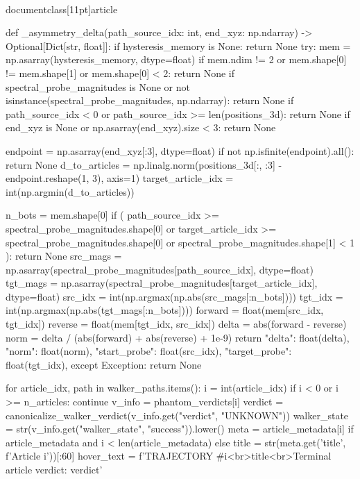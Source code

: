 \\documentclass[11pt]{article}
\begin{document}
\begin{CodeBlock}
{{    def _asymmetry_delta(path_source_idx: int, end_xyz: np.ndarray) -> Optional[Dict[str, float]]:
        if hysteresis_memory is None:
            return None
        try:
            mem = np.asarray(hysteresis_memory, dtype=float)
            if mem.ndim != 2 or mem.shape[0] != mem.shape[1] or mem.shape[0] < 2:
                return None
            if spectral_probe_magnitudes is None or not isinstance(spectral_probe_magnitudes, np.ndarray):
                return None
            if path_source_idx < 0 or path_source_idx >= len(positions_3d):
                return None
            if end_xyz is None or np.asarray(end_xyz).size < 3:
                return None

            endpoint = np.asarray(end_xyz[:3], dtype=float)
            if not np.isfinite(endpoint).all():
                return None
            d_to_articles = np.linalg.norm(positions_3d[:, :3] - endpoint.reshape(1, 3), axis=1)
            target_article_idx = int(np.argmin(d_to_articles))

            n_bots = mem.shape[0]
            if (
                path_source_idx >= spectral_probe_magnitudes.shape[0]
                or target_article_idx >= spectral_probe_magnitudes.shape[0]
                or spectral_probe_magnitudes.shape[1] < 1
            ):
                return None
            src_mags = np.asarray(spectral_probe_magnitudes[path_source_idx], dtype=float)
            tgt_mags = np.asarray(spectral_probe_magnitudes[target_article_idx], dtype=float)
            src_idx = int(np.argmax(np.abs(src_mags[:n_bots])))
            tgt_idx = int(np.argmax(np.abs(tgt_mags[:n_bots])))
            forward = float(mem[src_idx, tgt_idx])
            reverse = float(mem[tgt_idx, src_idx])
            delta = abs(forward - reverse)
            norm = delta / (abs(forward) + abs(reverse) + 1e-9)
            return {
                "delta": float(delta),
                "norm": float(norm),
                "start_probe": float(src_idx),
                "target_probe": float(tgt_idx),
            }
        except Exception:
            return None

    for article_idx, path in walker_paths.items():
        i = int(article_idx)
        if i < 0 or i >= n_articles:
            continue
        v_info = phantom_verdicts[i]
        verdict = canonicalize_walker_verdict(v_info.get("verdict", "UNKNOWN"))
        walker_state = str(v_info.get("walker_state", "success")).lower()
        meta = article_metadata[i] if article_metadata and i < len(article_metadata) else {}
        title = str(meta.get('title', f'Article {i}'))[:60]
        hover_text = f'TRAJECTORY #{i}<br>{title}<br>Terminal article verdict: {verdict}'

}}
\end{CodeBlock}
\end{document}
